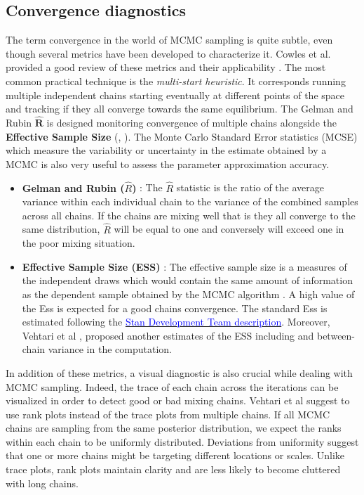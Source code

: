 \documentclass[nonatbib,preprint,12pt,authoryear]{elsarticle}
\begin{document}
\subsection{Convergence diagnostics}
The term convergence in the world of MCMC sampling is quite subtle, even though several metrics have been developed to characterize it. Cowles et al. provided a good review of these metrics and their applicability \cite{cowles_markov_1996}.  
The most common practical technique is the \textit{multi-start heuristic}. It corresponds running multiple independent chains starting eventually at different points of the space and tracking if they all converge towards the same equilibrium. The Gelman and Rubin $\mathbf{\hat{R}}$ is designed  monitoring convergence of multiple chains alongside the \textbf{Effective Sample Size} (\cite{vehtari_rank-normalization_2021}, \cite{cowles_markov_1996}). The Monte Carlo Standard Error statistics (MCSE) which measure the variability or uncertainty in the estimate  obtained by a MCMC is also very useful to assess the parameter approximation accuracy. 


\begin{itemize}
     \item \textbf{Gelman and Rubin ($\hat{R}$)} : The $\hat{R}$ statistic is the ratio of the average variance within each individual chain to the variance of the combined samples across all chains. If the chains are mixing well that is they all converge to the same distribution, $\hat{R}$  will be equal to one and conversely will exceed one in the poor mixing situation.
     \item \textbf{Effective Sample Size (ESS)} : The effective sample size is a measures of the independent draws which would contain the same amount of information as the dependent sample obtained by the MCMC algorithm \cite{vehtari_rank-normalization_2021}. A high value of the Ess is expected for a good  chains convergence. The standard Ess is estimated following the \href{https://mc-stan.org/docs/2_18/reference-manual/effective-sample-size-section.html#definition-of-effective-sample-size}{\textcolor{blue}{Stan Development Team description}}. Moreover, Vehtari et al \cite{vehtari_rank-normalization_2021}, proposed another estimates of the ESS including and between-chain variance in the computation. 
\end{itemize}
In addition of these metrics, a visual diagnostic is also crucial while dealing with MCMC sampling. Indeed, the trace of each chain across the iterations can be visualized in order to detect good or bad mixing chains. Vehtari et al \cite{vehtari_rank-normalization_2021} suggest to use rank plots instead of the trace plots from multiple chains. If all MCMC chains are sampling from the same posterior distribution, we expect the ranks within each chain to be uniformly distributed. Deviations from uniformity suggest that one or more chains might be targeting different locations or scales. Unlike trace plots, rank plots maintain clarity and are less likely to become cluttered with long chains.
\end{document}
